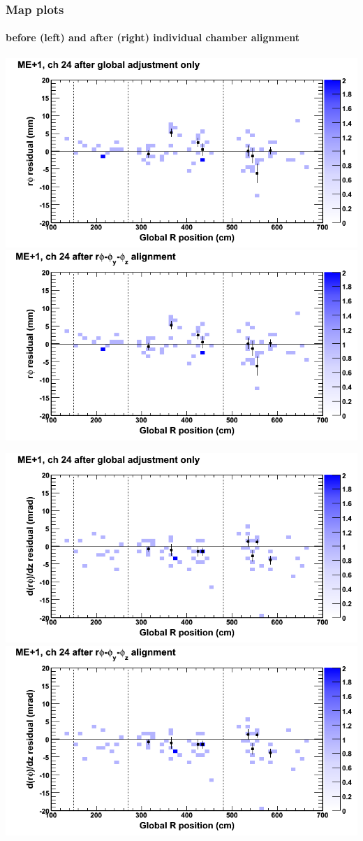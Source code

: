 \documentclass[compress]{beamer}
\begin{document}
\begin{frame}
\frametitle{Map plots}
\framesubtitle{before (left) and after (right) individual chamber alignment}
\includegraphics[width=0.5\linewidth]{ringmapplots_3dof/before_CSCvsr_mep1ch24_x.png} \includegraphics[width=0.5\linewidth]{ringmapplots_3dof/after_CSCvsr_mep1ch24_x.png}

\includegraphics[width=0.5\linewidth]{ringmapplots_3dof/before_CSCvsr_mep1ch24_dxdz.png} \includegraphics[width=0.5\linewidth]{ringmapplots_3dof/after_CSCvsr_mep1ch24_dxdz.png}
\end{frame}
\end{document}
